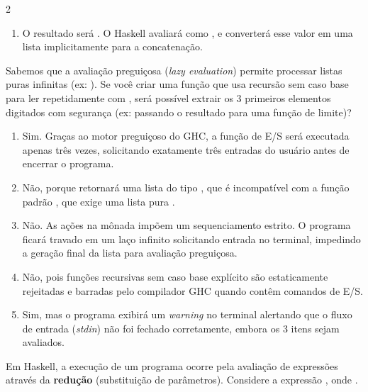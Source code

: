 \documentclass[a4paper,10pt,brazil]{article}
\begin{document}
\begin{multicols}{2}
\begin{enumerate}
  \item O resultado será \haskellinline{[3, 4, 5]}. O Haskell avaliará  como , e converterá esse valor em uma lista implicitamente para a concatenação.


\end{enumerate}

Sabemos que a avaliação preguiçosa (\emph{lazy evaluation}) permite processar listas puras infinitas (ex: ). 
Se você criar uma função  que usa recursão sem caso base para ler repetidamente com , será possível extrair os 3 primeiros elementos digitados com segurança (ex: passando o resultado para uma função de limite)?

\begin{enumerate}
  \item Sim. Graças ao motor preguiçoso do GHC, a função de E/S será executada apenas três vezes, solicitando exatamente três entradas do usuário antes de encerrar o programa.

  \item Não, porque  retornará uma lista do tipo \haskellinline{[IO String]}, que é incompatível com a função padrão , que exige uma lista pura \haskellinline{[a]}.

  \item Não. As ações na mônada  impõem um sequenciamento estrito. O programa ficará travado em um laço infinito solicitando entrada no terminal, impedindo a geração final da lista para avaliação preguiçosa.

  \item Não, pois funções recursivas sem caso base explícito são estaticamente rejeitadas e barradas pelo compilador GHC quando contêm comandos de E/S.

  \item Sim, mas o programa exibirá um \emph{warning} no terminal alertando que o fluxo de entrada (\emph{stdin}) não foi fechado corretamente, embora os 3 itens sejam avaliados.


\end{enumerate}

Em Haskell, a execução de um programa ocorre pela avaliação de expressões através da \textbf{redução} (substituição de parâmetros). Considere a expressão , onde . 


\end{multicols}
\end{document}
